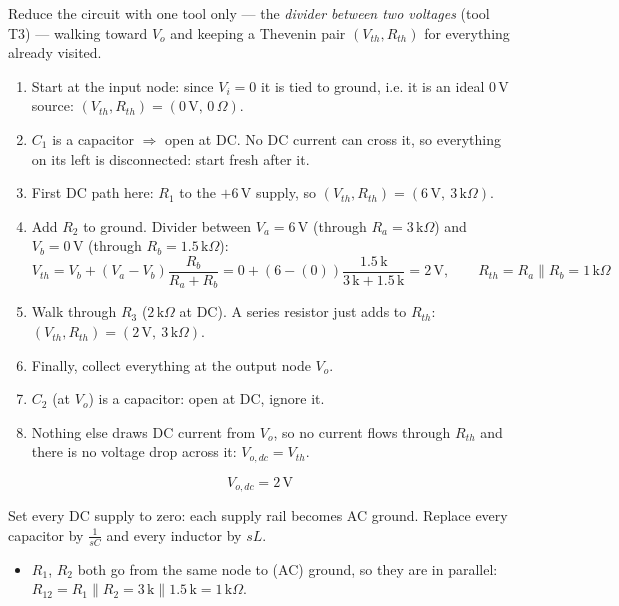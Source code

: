 \documentclass[11pt]{article}
\newcommand{\solstep}[2]{\par\medskip{\color{stepc}\textbf{Step #1 --- #2}}\par\nopagebreak}
\begin{document}
Reduce the circuit with one tool only --- the \emph{divider between two voltages} (tool T3) --- walking toward $V_o$ and keeping a Thevenin pair $(V_{th},R_{th})$ for everything already visited.
\begin{enumerate}[leftmargin=*,itemsep=2pt]
\item Start at the input node: since $V_i=0$ it is tied to ground, i.e. it is an ideal $0\,\mathrm{V}$ source: $(V_{th},R_{th})=(0\,\mathrm{V},\,0\,\Omega)$.
\item $C_{1}$ is a capacitor $\Rightarrow$ open at DC. No DC current can cross it, so everything on its left is disconnected: start fresh after it.
\item First DC path here: $R_{1}$ to the $+6\,\mathrm{V}$ supply, so $(V_{th},R_{th}) = (6\,\mathrm{V},\ 3\,\mathrm{k}\Omega)$.
\item Add $R_{2}$ to ground. Divider between $V_a=6\,\mathrm{V}$ (through $R_a=3\,\mathrm{k}\Omega$) and $V_b=0\,\mathrm{V}$ (through $R_b=1.5\,\mathrm{k}\Omega$):\[
V_{th} = V_b + (V_a-V_b)\frac{R_b}{R_a+R_b} = 0 + \left(6 - (0)\right)\frac{1.5\,\mathrm{k}}{3\,\mathrm{k} + 1.5\,\mathrm{k}} = 2\,\mathrm{V},\qquad R_{th} = R_a\parallel R_b = 1\,\mathrm{k}\Omega
\]

\item Walk through $R_{3}$ ($2\,\mathrm{k}\Omega$ at DC). A series resistor just adds to $R_{th}$: $(V_{th},R_{th}) = (2\,\mathrm{V},\ 3\,\mathrm{k}\Omega)$.
\item Finally, collect everything at the output node $V_o$.
\item $C_{2}$ (at $V_{o}$) is a capacitor: open at DC, ignore it.
\item Nothing else draws DC current from $V_o$, so no current flows through $R_{th}$ and there is no voltage drop across it: $V_{o,dc}=V_{th}$.
\end{enumerate}

\[
\boxed{V_{o,dc} = 2\,\mathrm{V}}
\]

\solstep{3}{AC circuit}Set every DC supply to zero: each supply rail becomes AC ground. Replace every capacitor by $\frac{1}{sC}$ and every inductor by $sL$.
\begin{itemize}[leftmargin=*,itemsep=2pt]
\item $R_{1}$, $R_{2}$ both go from the same node to (AC) ground, so they are in parallel: $R_{12} = R_{1} \parallel R_{2} = 3\,\mathrm{k} \parallel 1.5\,\mathrm{k} = 1\,\mathrm{k}\Omega$.
\end{itemize}
\end{document}
